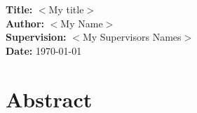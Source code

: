 \documentclass[11pt,a4paper]{article}
\newcommand{\dummy}[1]{$<$#1$>$}
\newcommand{\titles}[2]{\noindent\textbf{#1:} #2\\[2mm]}
\begin{document}
\titles{Title}{\dummy{My title}}
\titles{Author}{\dummy{My Name}}
\titles{Supervision}{\dummy{My Supervisors Names}}
\titles{Date}{\today}

\section*{Abstract}

\lipsum[10-13]


\nocite{*}  %



\end{document}
